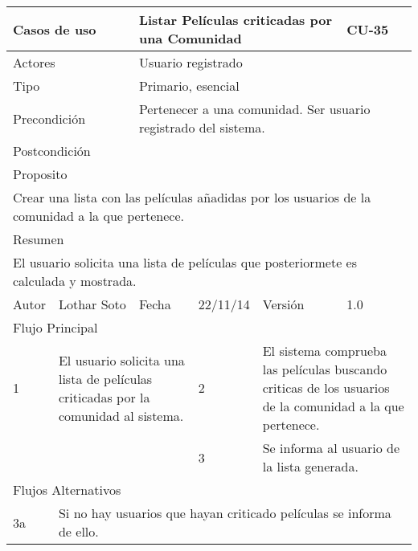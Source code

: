 \documentclass{article}
\begin{document}
\begin{table}[h]
\begin{tabular}{|l|l|l|l|l|l|}
\hline
\multicolumn{2}{|p{2cm}|}{Casos de uso}  & \multicolumn{3}{p{7cm}|}{Listar Películas criticadas por una Comunidad} & CU-35 \\
\hline
\multicolumn{2}{|p{2cm}|}{Actores}       & \multicolumn{4}{p{8cm}|}{Usuario registrado}        \\
\hline
\multicolumn{2}{|p{2cm}|}{Tipo}          & \multicolumn{4}{p{8cm}|}{Primario, esencial}        \\
\hline
\multicolumn{2}{|p{2cm}|}{Precondición}  & \multicolumn{4}{p{8cm}|}{Pertenecer a una comunidad. Ser usuario registrado del sistema.}        \\
\hline
\multicolumn{2}{|p{2cm}|}{Postcondición} & \multicolumn{4}{p{8cm}|}{}        \\
\hline
\multicolumn{6}{|p{10cm}|}{Proposito}                                   \\
\hline
\multicolumn{6}{|p{10cm}|}{Crear una lista con las películas añadidas por los usuarios de la comunidad a la que pertenece.}                                            \\
\hline
\multicolumn{6}{|p{10cm}|}{Resumen}                                 \\
\hline
\multicolumn{6}{|p{10cm}|}{El usuario solicita una lista de películas que posteriormete es calculada y mostrada.}                                            \\
\hline
Autor         &       Lothar Soto        &  Fecha   &  22/11/14   &   Versión  & 1.0\\
\hline
\multicolumn{6}{|p{10cm}|}{Flujo Principal}\\
\hline
\multicolumn{1}{|p{1cm}|}{1} & \multicolumn{2}{p{3cm}}{El usuario solicita una lista de películas criticadas por la comunidad al sistema.} & \multicolumn{1}{|p{1cm}|}{2} & \multicolumn{2}{p{3cm}|}{El sistema comprueba las películas buscando criticas de los usuarios de la comunidad a la que pertenece.}\\
\hline
\multicolumn{1}{|p{1cm}|}{} & \multicolumn{2}{p{3cm}}{} & \multicolumn{1}{|p{1cm}|}{3} & \multicolumn{2}{p{3cm}|}{Se informa al usuario de la lista generada.}\\
\hline
\multicolumn{6}{|p{10cm}|}{Flujos Alternativos}\\
\hline
\multicolumn{1}{|p{1cm}}{3a} & \multicolumn{5}{|p{9cm}|}{Si no hay usuarios que hayan criticado películas se informa de ello.}\\

\end{tabular}
\end{table}
\end{document}

